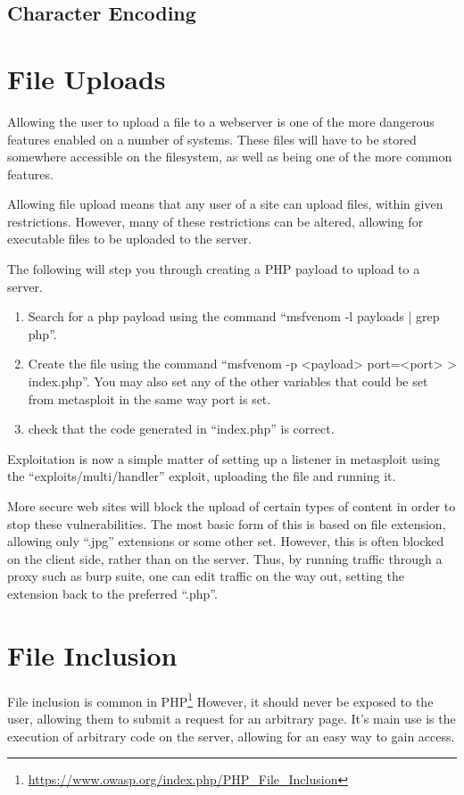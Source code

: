 		\subsection{Character Encoding}
	\section{File Uploads}
		Allowing the user to upload a file to a webserver is one of the more dangerous features enabled on a number of systems. 
		These files will have to be stored somewhere accessible on the filesystem, as well as being one of the more common features. 

		Allowing file upload means that any user of a site can upload files, within given restrictions. 
		However, many of these restrictions can be altered, allowing for executable files to be uploaded to the server. 

		The following will step you through creating a PHP payload to upload to a server. 
		\begin{enumerate}
			\item Search for a php payload using the command ``msfvenom -l payloads | grep php''. 
			\item Create the file using the command ``msfvenom -p <payload> port=<port> > index.php''.
				You may also set any of the other variables that could be set from metasploit in the same way port is set.
			\item check that the code generated in ``index.php'' is correct. 
		\end{enumerate}

		Exploitation is now a simple matter of setting up a listener in metasploit using the ``exploits/multi/handler'' exploit, uploading the file and running it.

		More secure web sites will block the upload of certain types of content in order to stop these vulnerabilities. 
		The most basic form of this is based on file extension, allowing only ``.jpg'' extensions or some other set. 
		However, this is often blocked on the client side, rather than on the server. 
		Thus, by running traffic through a proxy such as burp suite, 
		one can edit traffic on the way out, setting the extension back to the preferred ``.php''. 
	\section{File Inclusion}
		File inclusion is common in PHP\footnote{\url{https://www.owasp.org/index.php/PHP\_File\_Inclusion}}
		However, it should never be exposed to the user, allowing them to submit a request for an arbitrary page. 
		It's main use is the execution of arbitrary code on the server, allowing for an easy way to gain access. 

